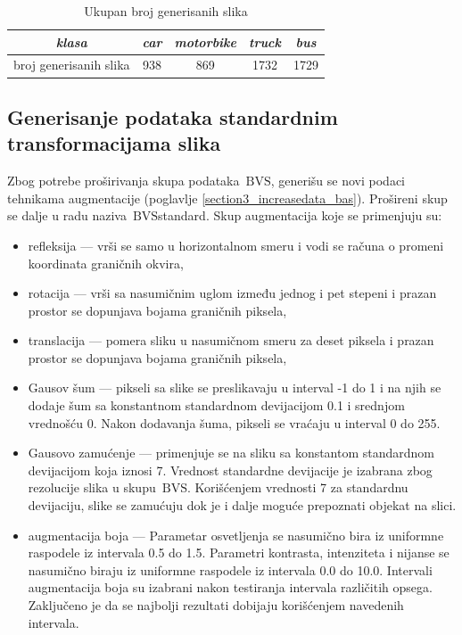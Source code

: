 \documentclass[12pt,oneside]{memoir}
\newcommand{\bvs}{\ensuremath{\,\textrm{BVS}}}
\begin{document}
\begin{table}[h!]
    \begin{center}
    \caption{Ukupan broj generisanih slika}\label{tab:section4_generisaneslike}
    \begin{tabular}{c|c|c|c|c}
        \textit{klasa} & \textit{car} &  \textit{motorbike} &  \textit{truck} & \textit{bus} \\ 
        \hline
        broj generisanih slika & 938 & 869 & 1732 & 1729 \\ 
    \end{tabular}
    \end{center}
\end{table}

\clearpage
\subsection{Generisanje podataka standardnim transformacijama slika}

Zbog potrebe proširivanja skupa podataka \bvs, generišu se novi podaci tehnikama augmentacije (poglavlje \ref{section3_increasedata_bas}). Prošireni skup se dalje u radu naziva \bvs{standard}.
Skup augmentacija koje se primenjuju su: 
\begin{itemize}
    \item refleksija --- vrši se samo u horizontalnom smeru i vodi se računa o promeni koordinata graničnih okvira, 
    \item rotacija --- vrši sa nasumičnim uglom između jednog i pet stepeni i prazan prostor se dopunjava bojama graničnih piksela,
    \item translacija ---  pomera sliku u nasumičnom smeru za deset piksela i prazan prostor se dopunjava bojama graničnih piksela,
    \item Gausov šum --- pikseli sa slike se preslikavaju u interval -1 do 1 i na njih se dodaje šum sa konstantnom standardnom devijacijom 0.1 i srednjom vrednošću 0. Nakon dodavanja šuma, pikseli se vraćaju u interval 0 do 255.
    \item Gausovo zamućenje --- primenjuje se na sliku sa konstantom standardnom devijacijom koja iznosi 7. Vrednost standardne devijacije je izabrana zbog rezolucije slika u skupu \bvs. Korišćenjem vrednosti 7 za standardnu devijaciju, slike se zamućuju dok je i dalje moguće prepoznati objekat na slici.
    \item augmentacija boja --- Parametar osvetljenja se nasumično bira iz uniformne raspodele iz intervala 0.5 do 1.5. Parametri kontrasta, intenziteta i nijanse se nasumično biraju iz uniformne raspodele iz intervala 0.0 do 10.0. Intervali augmentacija boja su izabrani nakon testiranja intervala različitih opsega. Zaključeno je da se najbolji rezultati dobijaju korišćenjem navedenih intervala.
\end{itemize}
\end{document}
